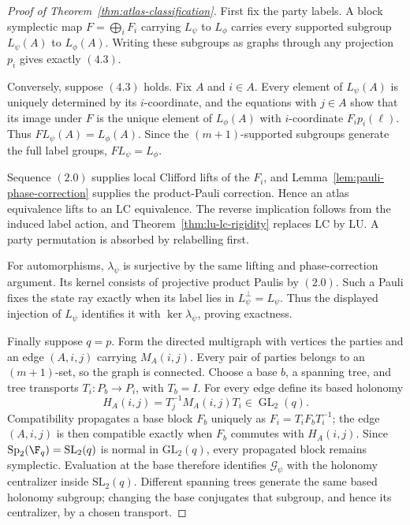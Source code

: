 \begin{proof}[Proof of Theorem~\ref{thm:atlas-classification}]
First fix the party labels.  A block symplectic map
\(F=\bigoplus_iF_i\) carrying \(L_\psi\) to \(L_\phi\) carries every
supported subgroup \(L_\psi(A)\) to \(L_\phi(A)\).  Writing these
subgroups as graphs through any projection \(p_i\) gives exactly
\((4.3)\).

Conversely, suppose \((4.3)\) holds.  Fix \(A\) and \(i\in A\).  Every
element of \(L_\psi(A)\) is uniquely determined by its \(i\)-coordinate,
and the equations with \(j\in A\) show that its image under \(F\) is the
unique element of \(L_\phi(A)\) with \(i\)-coordinate \(F_i p_i(\ell)\).
Thus \(F L_\psi(A)=L_\phi(A)\).  Since the \((m+1)\)-supported subgroups
generate the full label groups, \(F L_\psi=L_\phi\).

Sequence \((2.0)\) supplies local Clifford lifts of the \(F_i\), and
Lemma~\ref{lem:pauli-phase-correction} supplies the product-Pauli
correction.  Hence an atlas equivalence lifts to an LC equivalence.
The reverse implication follows
from the induced label action, and Theorem~\ref{thm:lu-lc-rigidity}
replaces LC by LU.  A party permutation is absorbed by relabelling first.

For automorphisms, \(\lambda_\psi\) is surjective by the same lifting and
phase-correction argument.  Its kernel consists of projective product
Paulis by \((2.0)\).  Such a Pauli fixes the state ray exactly when its
label lies in \(L_\psi^\perp=L_\psi\).  Thus the displayed injection of
\(L_\psi\) identifies it with \(\ker\lambda_\psi\), proving exactness.

Finally suppose \(q=p\).  Form the directed multigraph with vertices the
parties and an edge \((A,i,j)\) carrying \(M_A(i,j)\).  Every pair of
parties belongs to an \((m+1)\)-set, so the graph is connected.  Choose a
base \(b\), a spanning tree, and tree transports
\(T_i:P_b\to P_i\), with \(T_b=I\).  For every edge define its based
holonomy
\[
 H_A(i,j)=T_j^{-1}M_A(i,j)T_i\in\operatorname{GL}_2(q).
\]
Compatibility propagates a base block \(F_b\) uniquely as
\(F_i=T_iF_bT_i^{-1}\); the edge \((A,i,j)\) is then compatible exactly
when \(F_b\) commutes with \(H_A(i,j)\).  Since
\(\operatorname{Sp}_2(\F_q)=\mathrm{SL}_2(q)\) is normal in
\(\mathrm{GL}_2(q)\), every propagated block remains symplectic.
Evaluation at the base therefore identifies
\(\mathcal G_\psi\) with the holonomy centralizer inside
\(\mathrm{SL}_2(q)\).  Different spanning trees generate the same based
holonomy subgroup; changing the base conjugates that subgroup, and hence
its centralizer, by a chosen transport.
\end{proof}

